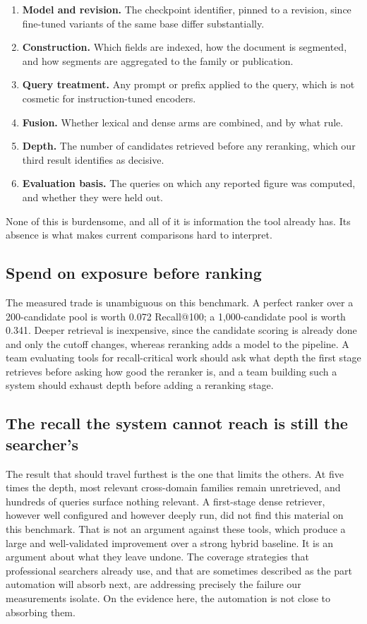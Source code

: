 \documentclass[preprint,11pt,authoryear]{elsarticle}
\begin{document}
\begin{enumerate}
\item \textbf{Model and revision.} The checkpoint identifier, pinned to a revision, since fine-tuned variants of the same base differ substantially.
\item \textbf{Construction.} Which fields are indexed, how the document is segmented, and how segments are aggregated to the family or publication.
\item \textbf{Query treatment.} Any prompt or prefix applied to the query, which is not cosmetic for instruction-tuned encoders.
\item \textbf{Fusion.} Whether lexical and dense arms are combined, and by what rule.
\item \textbf{Depth.} The number of candidates retrieved before any reranking, which our third result identifies as decisive.
\item \textbf{Evaluation basis.} The queries on which any reported figure was computed, and whether they were held out.
\end{enumerate}

None of this is burdensome, and all of it is information the tool already has. Its absence is what makes current comparisons hard to interpret.

\subsection{Spend on exposure before ranking}

The measured trade is unambiguous on this benchmark. A perfect ranker over a 200-candidate pool is worth 0.072 Recall@100; a 1{,}000-candidate pool is worth 0.341. Deeper retrieval is inexpensive, since the candidate scoring is already done and only the cutoff changes, whereas reranking adds a model to the pipeline. A team evaluating tools for recall-critical work should ask what depth the first stage retrieves before asking how good the reranker is, and a team building such a system should exhaust depth before adding a reranking stage.

\subsection{The recall the system cannot reach is still the searcher's}

The result that should travel furthest is the one that limits the others. At five times the depth, most relevant cross-domain families remain unretrieved, and hundreds of queries surface nothing relevant. A first-stage dense retriever, however well configured and however deeply run, did not find this material on this benchmark. That is not an argument against these tools, which produce a large and well-validated improvement over a strong hybrid baseline. It is an argument about what they leave undone. The coverage strategies that professional searchers already use, and that are sometimes described as the part automation will absorb next, are addressing precisely the failure our measurements isolate. On the evidence here, the automation is not close to absorbing them.
\end{document}
